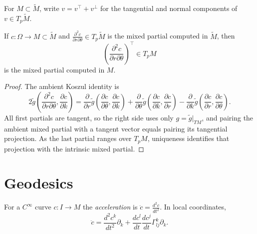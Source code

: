 For $M\subset\tilde M$, write $v=v^\top+v^\perp$ for the tangential and normal
components of $v\in T_p\tilde M$.

\begin{proposition}
  \label{prop:pet-ch5-mixed-partials-submanifold}
  \leanok
  If $c:\Omega\to M\subset\tilde M$ and $\frac{\partial^2c}{\partial r\partial\theta}\in T_p\tilde M$
  is the mixed partial computed in $\tilde M$, then
  \[
    \left(\frac{\partial^2c}{\partial r\partial\theta}\right)^\top\in T_pM
  \]
  is the mixed partial computed in $M$.
\end{proposition}
\begin{proof}
  \leanok
  \sketch
  The ambient Koszul identity is
  \[
    2\tilde g\!\left(\frac{\partial^2c}{\partial r\partial\theta},\frac{\partial c}{\partial k}\right)
    =\frac{\partial}{\partial r}\tilde g\!\left(\frac{\partial c}{\partial\theta},\frac{\partial c}{\partial k}\right)
    +\frac{\partial}{\partial\theta}\tilde g\!\left(\frac{\partial c}{\partial k},\frac{\partial c}{\partial r}\right)
    -\frac{\partial}{\partial k}\tilde g\!\left(\frac{\partial c}{\partial r},\frac{\partial c}{\partial\theta}\right).
  \]
  All first partials are tangent, so the right side uses only
  $g=\tilde g|_{TM}$, and pairing the ambient mixed partial with a tangent vector
  equals pairing its tangential projection.  As the last partial ranges over
  $T_pM$, uniqueness identifies that projection with the intrinsic mixed partial.
\end{proof}

\section{Geodesics}

\begin{definition}
  \label{def:pet-ch5-acceleration}
  \leanok
  For a $C^\infty$ curve $c:I\to M$ the \emph{acceleration} is $\ddot c=\frac{d^2c}{dt^2}$.
  In local coordinates,
  \[
    \ddot c=\frac{d^2c^k}{dt^2}\partial_k+\frac{dc^l}{dt}\frac{dc^j}{dt}\Gamma^k_{lj}\partial_k.
  \]
\end{definition}

